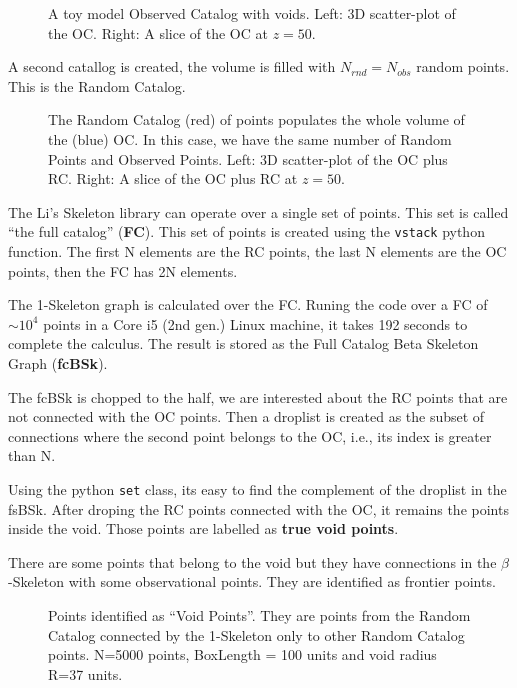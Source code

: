 \documentclass[preprint]{aastex62}
\begin{document}
\begin{figure}
  \caption{A toy model Observed Catalog with voids. Left: 3D scatter-plot
    of the OC. Right: A slice of the OC at $z=50$.\label{fig:scatter_OC}}
\end{figure}

A second catallog is created, the volume is filled with $N_{rnd}=N_{obs}$ random
points. This is the Random Catalog. 

\begin{figure}
  \caption{The Random Catalog (red) of points populates the whole volume of the
    (blue) OC.
    In this case, we have the same number of Random Points and Observed Points.
    Left: 3D scatter-plot of the OC plus RC. Right: A slice of the OC plus RC
    at $z=50$.\label{fig:scatter_OC+RC}}
\end{figure}


The Li's Skeleton library can operate over a single set of points. This set is called
``the full catalog'' (\textbf{FC}). This set of points is created using the
\texttt{vstack} python function. The first N elements are the RC points, the last
N elements are the OC points, then the FC has 2N elements.

The 1-Skeleton graph is calculated over the FC. Runing the code over a FC of
$\sim 10^4$ points in a Core i5 (2nd gen.) Linux machine, it takes 192 seconds
to complete the calculus. The result is stored as the Full Catalog Beta
Skeleton Graph (\textbf{fcBSk}).

The fcBSk is chopped to the half, we are interested about the RC points that
are not connected with the OC points. Then a droplist is created as the
subset of connections where the second point belongs to the OC, i.e., its index
is greater than N.

Using the python  \texttt{set} class, its easy to find the complement of the
droplist in the fsBSk. After droping the RC points connected with the OC, it
remains the points inside the void. Those points are labelled as
\textbf{true void points}.

There are some points that belong to the void but they have connections in the
$\beta$-Skeleton with some observational points. They are identified as
frontier points.


\begin{figure}
  \caption{Points identified as ``Void Points''. They are points from the Random Catalog
    connected by the 1-Skeleton only to other Random Catalog points. 
    N=5000 points, BoxLength = 100 units and void radius R=37 units.
    \label{fig:First void recognition}}
\end{figure}
\end{document}
